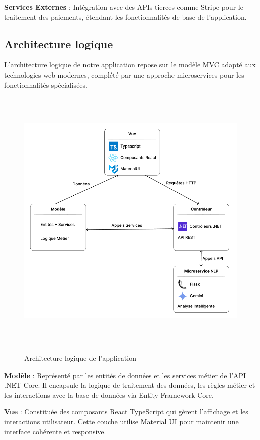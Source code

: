 \noindent \textbf{Services Externes} : Intégration avec des APIs tierces comme Stripe pour le traitement des paiements, étendant les fonctionnalités de base de l'application.

\subsection{Architecture logique}

\noindent L'architecture logique de notre application repose sur le modèle MVC adapté aux technologies web modernes, complété par une approche microservices pour les fonctionnalités spécialisées.



\begin{figure}[H]
    \centering
    \includegraphics[width=15cm, height=13cm]{images/Architecturelogique.PNG}
    \label{fig:arch_logique}
    \caption{Architecture logique de l'application}
\end{figure}


\noindent \textbf{Modèle} : Représenté par les entités de données et les services métier de l'API .NET Core. Il encapsule la logique de traitement des données, les règles métier et les interactions avec la base de données via Entity Framework Core.

\noindent \textbf{Vue} : Constituée des composants React TypeScript qui gèrent l'affichage et les interactions utilisateur. Cette couche utilise Material UI pour maintenir une interface cohérente et responsive.

